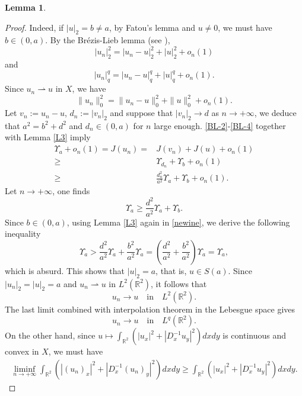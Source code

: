 \documentclass[11pt]{amsart}
\newtheorem{lemma}[theorem]{Lemma}
\numberwithin{equation}{section}
\begin{document}
{{{\begin{lemma}
\end{lemma}
\begin{proof}Indeed, if $|u|_2=b \not=a$, by Fatou's lemma and $u \not=0 $, we must have $b \in (0,a)$. By the Br\'{e}zis-Lieb lemma (see \cite[Lemma 1.32]{Willem}  ),
\begin{equation}\label{BL-1}
|u_n|_2^{2}=|u_n-u|_{2}^{2}+|u|_{2}^{2}+o_n(1)
\end{equation}
and
\begin{equation}\label{BL-2}
|u_n|_q^{q}=|u_n-u|_{q}^{q}+|u|_{q}^{q}+o_n(1).
\end{equation}
Since $u_n \rightharpoonup u$ in $X$, we have
\begin{equation}\label{BL-4}
\|u_n\|_0^{2}=\|u_n-u\|_0^{2}+\|u\|_0^{2}+o_n(1).
\end{equation}
{Let $v_n:=u_n-u$, $d_n:=|v_n|_2$} and suppose that $|v_n|_2 \to d$ as $n \to +\infty$, we deduce that $a^2=b^2+d^2$ and $d_n \in (0,a)$ for $n$ large enough. \eqref{BL-2}-\eqref{BL-4} together with Lemma \ref{L3} imply
\begin{align*}
\Upsilon_{a}+o_n(1)=J(u_n)=&J(v_n)+J(u)+o_n(1)\\
\geq &\Upsilon_{d_n}+\Upsilon_b+o_n(1)\\
\geq &\frac{d_n^2}{a^2}\Upsilon_{a}+\Upsilon_b+o_n(1).
\end{align*}
Let $n \to +\infty$, one finds
    \begin{equation}\label{newine}
    \Upsilon_{a} \geq \frac{d^2}{a^2}\Upsilon_{a}+\Upsilon_b.
    \end{equation}
    Since $b \in (0,a)$, using Lemma \ref{L3} again in \eqref{newine}, we derive the following inequality
    $$
    \Upsilon_{a} > \frac{d^2}{a^2}\Upsilon_{a}+\frac{b^2}{a^2}\Upsilon_{a}=\left(\frac{d^2}{a^2}+\frac{b^2}{a^2}\right)\Upsilon_a=\Upsilon_a,
    $$
    which is absurd. This shows that $|u|_2=a$, that is, $u \in S(a)$.
Since $|u_n|_2=|u|_2=a$ and $u_n \rightharpoonup u$ in $L^{2}(\mathbb{R}^2)$, it follows that
$$
u_n \to u \quad \mbox{in} \quad L^{2}(\mathbb{R}^2).
$$
{The last limit combined} with interpolation theorem in the Lebesgue space gives
$$
u_n \to u \quad \mbox{in} \quad L^{q}(\mathbb{R}^2).
$$
On the other hand, since {$u \mapsto \displaystyle \int_{\mathbb{R}^{2}} \left(|u_{x}|^{2} + |D^{-1}_{x} u_{y}|^{2} \right)dx dy$}
is continuous and convex in $X$, we must have
\begin{align*}
\liminf_{n\to +\infty}\displaystyle\int_{\mathbb{R}^{2}} \left(|(u_{n})_{x}|^{2} + |D^{-1}_{x} (u_{n})_{y}|^{2} \right)dx dy
\geq\displaystyle\int_{\mathbb{R}^{2}} \left(|u_{x}|^{2} + |D^{-1}_{x} u_{y}|^{2} \right)dx dy.

\end{align*}
\end{proof}}}}
\end{document}
